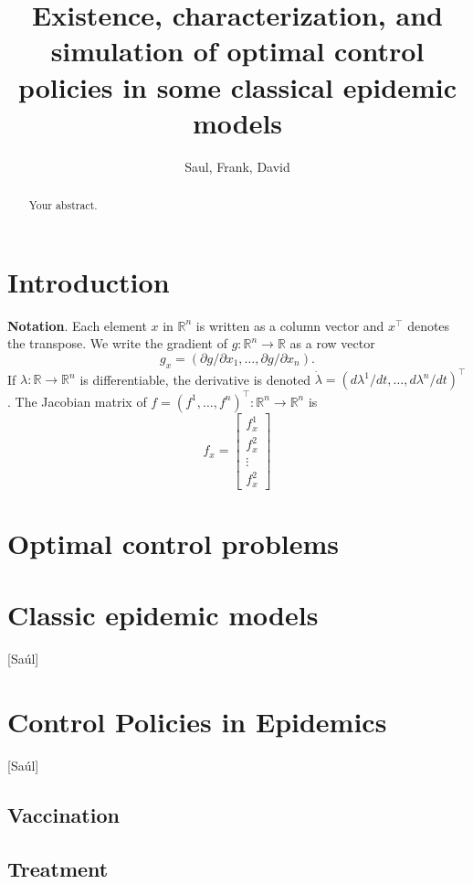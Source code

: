 \documentclass[a4paper]{article}
\title{
	Existence, characterization, and simulation
	of optimal control policies in some classical epidemic models
}
\author{Saul, Frank, David}
\newcommand{\R}{\mathbb{R}}
\begin{document}
\maketitle

\begin{abstract}
	Your abstract.
\end{abstract}

\section{Introduction}

{\bf Notation}. Each element $x$ in $\R^n$ is written as a column vector and $x^\top$ denotes the transpose. We write the gradient of $g:\R^n\to\R$ as a row vector 
    \[ g_x =(\partial g/\partial x_1,\ldots, \partial g/\partial x_n). \]
If $\lambda:\R\to\R^n$ is differentiable, the derivative is denoted $\dot{\lambda}=(d\lambda^1/dt,\ldots,d\lambda^n/dt)^\top$. The Jacobian matrix of $f=(f^1,\ldots,f^n)^\top:\R^n\to\R^n$ is   
\[f_x=\begin{bmatrix}
f^1_x\\
f^2_x\\
\vdots \\
f^2_x
\end{bmatrix}\]

\section{Optimal control problems}

	


\section{Classic epidemic models}
[Saúl]



\section{Control Policies in Epidemics}
	[Saúl]
    	
    \subsection{Vaccination}
    	
    \subsection{Treatment}
    	
\end{document}
